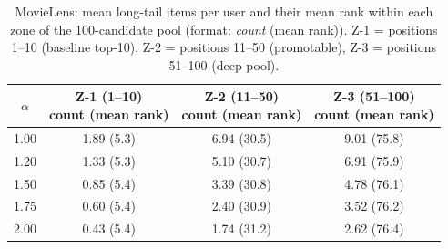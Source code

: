 \begin{table}[htbp]
\centering
\caption{MovieLens: mean long-tail items per user and their mean rank within each zone of the 100-candidate pool (format: \emph{count} (mean rank)). Z-1 = positions 1--10 (baseline top-10), Z-2 = positions 11--50 (promotable), Z-3 = positions 51--100 (deep pool).}
\label{tab:pool_position_ml}
\begin{tabular}{cccc}
\toprule
$\alpha$ & \makecell{Z-1 (1--10)\\count (mean rank)} & \makecell{Z-2 (11--50)\\count (mean rank)} & \makecell{Z-3 (51--100)\\count (mean rank)} \\
\midrule
\rowcolor{gray!8} 1.00 & 1.89 (5.3) & 6.94 (30.5) & 9.01 (75.8) \\
1.20 & 1.33 (5.3) & 5.10 (30.7) & 6.91 (75.9) \\
\rowcolor{gray!8} 1.50 & 0.85 (5.4) & 3.39 (30.8) & 4.78 (76.1) \\
1.75 & 0.60 (5.4) & 2.40 (30.9) & 3.52 (76.2) \\
\rowcolor{gray!8} 2.00 & 0.43 (5.4) & 1.74 (31.2) & 2.62 (76.4) \\
\bottomrule
\end{tabular}
\end{table}
